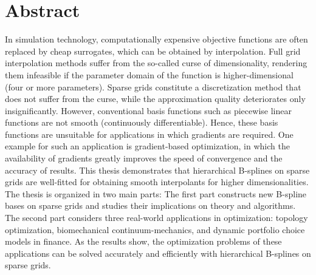 
\printornamentsfalse
\section*{Abstract}
\printornamentstrue

In simulation technology, computationally expensive objective functions
are often replaced by cheap surrogates,
which can be obtained by interpolation.
Full grid interpolation methods suffer from the
so-called curse of dimensionality,
rendering them infeasible if the parameter domain of the function
is higher-dimensional (four or more parameters).
Sparse grids constitute a discretization method that does not suffer from the
curse, while the approximation quality deteriorates only insignificantly.
However, conventional basis functions such as piecewise linear functions
are not smooth (continuously differentiable).
Hence, these basis functions are unsuitable for applications
in which gradients are required.
One example for such an application is gradient-based optimization,
in which the availability of gradients greatly improves the speed of
convergence and the accuracy of results.
This thesis demonstrates that hierarchical B-splines on sparse grids are
well-fitted for obtaining smooth interpolants for higher dimensionalities.
The thesis is organized in two main parts:
The first part constructs new B-spline bases on sparse grids and studies
their implications on theory and algorithms.
The second part considers three real-world applications in optimization:
topology optimization, biomechanical continuum-mechanics, and
dynamic portfolio choice models in finance.
As the results show, the optimization problems of these applications
can be solved accurately and efficiently with hierarchical B-splines on
sparse grids.

\pagebreak

